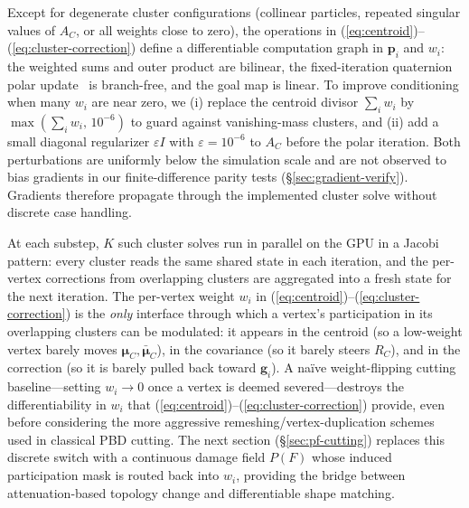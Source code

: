 \documentclass[letterpaper, 10 pt, conference]{ieeeconf}  %
\theoremstyle{tight}
\begin{document}
Except for degenerate cluster configurations (collinear particles,
repeated singular values of $A_C$, or all weights close to zero), the
operations in (\ref{eq:centroid})--(\ref{eq:cluster-correction}) define
a differentiable computation graph in $\mathbf{p}_i$ and $w_i$: the
weighted sums and outer product are bilinear, the fixed-iteration
quaternion polar update~\cite{muller2016} is branch-free, and the goal
map is linear. To improve conditioning when many $w_i$ are near zero,
we (i) replace the centroid divisor $\sum_i w_i$ by
$\max(\sum_i w_i, \,10^{-6})$ to guard against vanishing-mass clusters,
and (ii) add a small diagonal regularizer $\varepsilon I$ with
$\varepsilon \!=\! 10^{-6}$ to $A_C$ before the polar iteration. Both
perturbations are uniformly below the simulation scale and are not
observed to bias gradients in our finite-difference parity tests
(\S\ref{sec:gradient-verify}). Gradients therefore propagate through
the implemented cluster solve without discrete case handling.

At each substep, $K$ such cluster solves run in parallel on the GPU in
a Jacobi pattern: every cluster reads the same shared state in each
iteration, and the per-vertex corrections from overlapping clusters
are aggregated into a fresh state for the next iteration. The
per-vertex weight $w_i$ in
(\ref{eq:centroid})--(\ref{eq:cluster-correction}) is the \emph{only}
interface through which a vertex's participation in its overlapping
clusters can be modulated: it appears in the centroid (so a low-weight
vertex barely moves $\boldsymbol{\mu}_C, \bar{\boldsymbol{\mu}}_C$), in
the covariance (so it barely steers $R_C$), and in the correction
(so it is barely pulled back toward $\mathbf{g}_i$). A na\"ive weight-flipping cutting baseline---setting $w_i \!\to\! 0$
once a vertex is deemed severed---destroys the differentiability in
$w_i$ that (\ref{eq:centroid})--(\ref{eq:cluster-correction}) provide,
even before considering the more aggressive remeshing/vertex-duplication
schemes used in classical PBD cutting. The next section
(\S\ref{sec:pf-cutting}) replaces this discrete switch with a
continuous damage field $P(F)$ whose induced participation mask is
routed back into $w_i$, providing the bridge between attenuation-based
topology change and differentiable shape matching.

\end{document}
